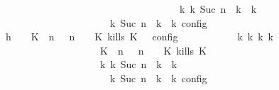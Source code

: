 \begin{isabellebody}
\ \ \ \ \ \ \ \ \ \ \ \ \ \ \ \ \ \ \ \ \ \ \ \ \ \ \ \ \ \ \ \ \ \ \ \ {\isasymhookrightarrow}\isactrlbsup k\isactrlesup \ {\isacharparenleft}{\isasymGamma}\isactrlsub k{\isacharcomma}\ Suc\ n\ {\isasymturnstile}\ {\isasymPsi}\isactrlsub k\ {\isasymtriangleright}\ {\isasymPhi}\isactrlsub k{\isacharparenright}{\isacharparenright}\isanewline
\ \ \ \ \ \ \ \ \ \ \ \ \ \ \ \ \ \ {\isasymand}\ {\isasymrho}\ {\isasymin}\ {\isasymlbrakk}\ {\isasymGamma}\isactrlsub k{\isacharcomma}\ Suc\ n\ {\isasymturnstile}\ {\isasymPsi}\isactrlsub k\ {\isasymtriangleright}\ {\isasymPhi}\isactrlsub k\ {\isasymrbrakk}\isactrlsub c\isactrlsub o\isactrlsub n\isactrlsub f\isactrlsub i\isactrlsub g{\isacartoucheclose}\isanewline
\ \ \ \ \ \ \isamarkupfalse%
\ {\isacharminus}\isanewline
\ \ \ \ \ \ \ \ \isamarkupfalse%
\ h{}{\isacharcolon}\ {\isacartoucheopen}{\isasymrho}\ {\isasymin}\ {\isasymlbrakk}\ {\isacharparenleft}{\isacharparenleft}K\ {\isasymnot}{\isasymUp}\ n{\isacharparenright}\ {\isacharhash}\ {\isasymGamma}{\isacharparenright}{\isacharcomma}\ n\ {\isasymturnstile}\ {\isasymPsi}\ {\isasymtriangleright}\ {\isacharparenleft}{\isacharparenleft}K\ kills\ K\ {\isacharhash}\ {\isasymPhi}{\isacharparenright}\ {\isasymrbrakk}\isactrlsub c\isactrlsub o\isactrlsub n\isactrlsub f\isactrlsub i\isactrlsub g{\isacartoucheclose}\isanewline
\ \ \ \ \ \ \ \ \isamarkupfalse%
\ \isamarkupfalse%
\ {\isacartoucheopen}{\isasymexists}{\isasymGamma}\isactrlsub k\ {\isasymPsi}\isactrlsub k\ {\isasymPhi}\isactrlsub k\ k{\isachardot}\isanewline
\ \ \ \ \ \ \ \ \ \ \ \ \ \ \ \ \ \ \ \ {\isacharparenleft}{\isacharparenleft}{\isacharparenleft}{\isacharparenleft}K\ {\isasymnot}{\isasymUp}\ n{\isacharparenright}\ {\isacharhash}\ {\isasymGamma}{\isacharparenright}{\isacharcomma}\ n\ {\isasymturnstile}\ {\isasymPsi}\ {\isasymtriangleright}\ {\isacharparenleft}{\isacharparenleft}K\ kills\ K\ {\isacharhash}\ {\isasymPhi}{\isacharparenright}{\isacharparenright}\isanewline
\ \ \ \ \ \ \ \ \ \ \ \ \ \ \ \ \ \ \ \ {\isasymhookrightarrow}\isactrlbsup k\isactrlesup \ {\isacharparenleft}{\isasymGamma}\isactrlsub k{\isacharcomma}\ Suc\ n\ {\isasymturnstile}\ {\isasymPsi}\isactrlsub k\ {\isasymtriangleright}\ {\isasymPhi}\isactrlsub k{\isacharparenright}{\isacharparenright}\isanewline
\ \ \ \ \ \ \ \ \ \ \ \ \ \ \ \ \ \ {\isasymand}\ {\isasymrho}\ {\isasymin}\ {\isasymlbrakk}\ {\isasymGamma}\isactrlsub k{\isacharcomma}\ Suc\ n\ {\isasymturnstile}\ {\isasymPsi}\isactrlsub k\ {\isasymtriangleright}\ {\isasymPhi}\isactrlsub k\ {\isasymrbrakk}\isactrlsub c\isactrlsub o\isactrlsub n\isactrlsub f\isactrlsub i\isactrlsub g{\isacartoucheclose}\isanewline

\end{isabellebody}
